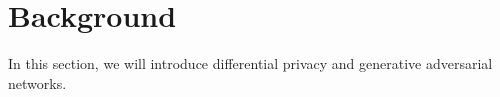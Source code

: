 \documentclass[conference]{IEEEtran}
\begin{document}




 


\section{Background}

In this section, we will introduce differential privacy and generative adversarial networks.
\end{document}
